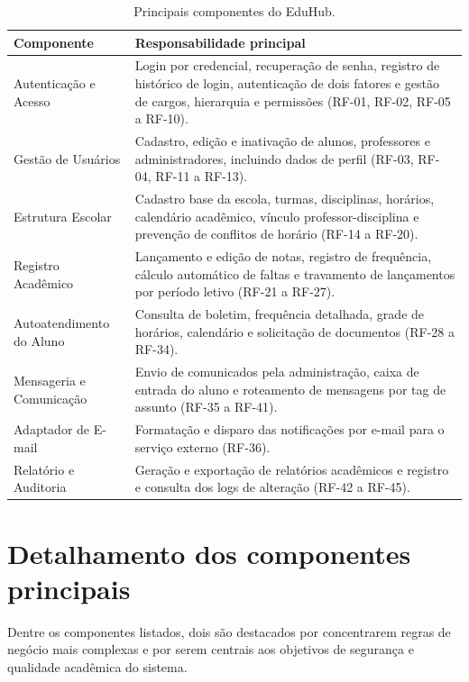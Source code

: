 \begin{table}[ht]
\centering
\caption{Principais componentes do EduHub.}
\label{tab:componentes}
\begin{tabularx}{\textwidth}{p{} X}
\toprule
\textbf{Componente} & \textbf{Responsabilidade principal} \\
\midrule
Autenticação e Acesso & Login por credencial, recuperação de senha, registro
de histórico de login, autenticação de dois fatores e gestão de cargos,
hierarquia e permissões (RF-01, RF-02, RF-05 a RF-10). \\
Gestão de Usuários & Cadastro, edição e inativação de alunos, professores e
administradores, incluindo dados de perfil (RF-03, RF-04, RF-11 a RF-13). \\
Estrutura Escolar & Cadastro base da escola, turmas, disciplinas, horários,
calendário acadêmico, vínculo professor-disciplina e prevenção de conflitos
de horário (RF-14 a RF-20). \\
Registro Acadêmico & Lançamento e edição de notas, registro de frequência,
cálculo automático de faltas e travamento de lançamentos por período letivo
(RF-21 a RF-27). \\
Autoatendimento do Aluno & Consulta de boletim, frequência detalhada, grade
de horários, calendário e solicitação de documentos (RF-28 a RF-34). \\
Mensageria e Comunicação & Envio de comunicados pela administração, caixa de
entrada do aluno e roteamento de mensagens por tag de assunto (RF-35 a
RF-41). \\
Adaptador de E-mail & Formatação e disparo das notificações por e-mail para o
serviço externo (RF-36). \\
Relatório e Auditoria & Geração e exportação de relatórios acadêmicos e
registro e consulta dos logs de alteração (RF-42 a RF-45). \\
\bottomrule
\end{tabularx}
\end{table}

\section{Detalhamento dos componentes principais}
\label{sec:detalhamento}

Dentre os componentes listados, dois são destacados por concentrarem regras
de negócio mais complexas e por serem centrais aos objetivos de segurança e
qualidade acadêmica do sistema.

